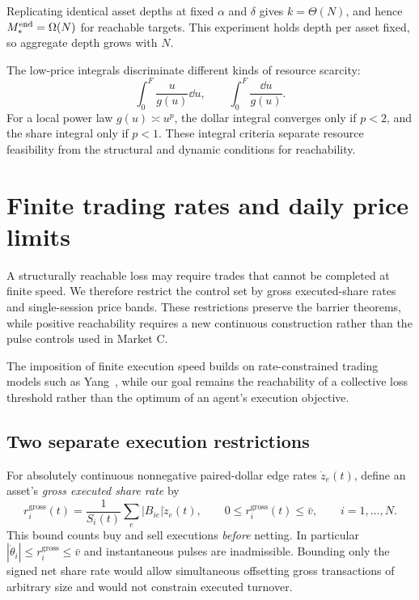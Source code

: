 \documentclass[review,hidelinks,onefignum,onetabnum]{siamonline250211}
\begin{document}
Replicating identical asset depths at fixed $\alpha$ and $\delta$ gives $k=\Theta(N)$, and hence $M_*^{\rm end}=\Omega(N)$ for reachable targets. This experiment holds depth per asset fixed, so aggregate depth grows with $N$.

The low-price integrals discriminate different kinds of resource scarcity:
\begin{equation}\label{eq:lowprice}
\int_0^F\frac{u}{g(u)}\dd u,\qquad
\int_0^F\frac{\dd u}{g(u)}.
\end{equation}
For a local power law $g(u)\asymp u^p$, the dollar integral converges only if $p<2$, and the share integral only if $p<1$. These integral criteria separate resource feasibility from the structural and dynamic conditions for reachability.


\section{Finite trading rates and daily price limits}\label{sec:rateband}
A structurally reachable loss may require trades that cannot be completed at finite speed. We therefore restrict the control set by gross executed-share rates and single-session price bands. These restrictions preserve the barrier theorems, while positive reachability requires a new continuous construction rather than the pulse controls used in Market C.

The imposition of finite execution speed builds on rate-constrained trading models such as Yang~\citep{Yang2019}, while our goal remains the reachability of a collective loss threshold rather than the optimum of an agent's execution objective.

\subsection{Two separate execution restrictions}\label{subsec:execution-restrictions}
For absolutely continuous nonnegative paired-dollar edge rates $\dot z_e(t)$, define an asset's \emph{gross executed share rate} by
\begin{equation}\label{eq:grossrate}
 r_i^{\mathrm{gross}}(t)=\frac{1}{S_i(t)}\sum_e |B_{ie}|\dot z_e(t),\qquad
 0\le r_i^{\mathrm{gross}}(t)\le\bar v,\qquad i=1,\ldots,N.
\end{equation}
This bound counts buy and sell executions \emph{before} netting. In particular $|\dot\theta_i|\le r_i^{\mathrm{gross}}\le\bar v$ and instantaneous pulses are inadmissible. Bounding only the signed net share rate would allow simultaneous offsetting gross transactions of arbitrary size and would not constrain executed turnover.
\end{document}
